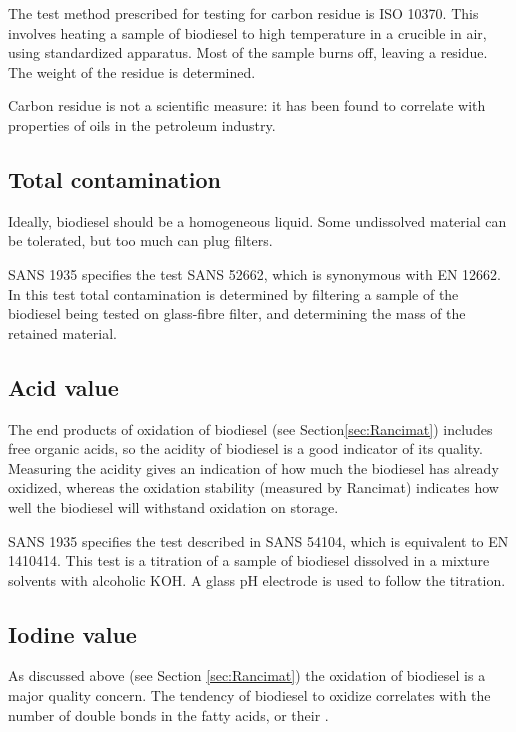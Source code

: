 The test method prescribed for testing for carbon residue is ISO 10370. This
involves heating a sample of biodiesel to high temperature in a crucible in air,
using standardized apparatus. Most of the sample burns off, leaving a residue.
The weight of the residue is determined.

Carbon residue is not a scientific measure: it has been found to correlate with
properties of oils in the petroleum industry.

\subsection{Total contamination}

Ideally, biodiesel should be a homogeneous liquid. Some undissolved material can
be tolerated, but too much can plug filters.

SANS 1935 specifies the test SANS 52662, which is synonymous with EN 12662. In
this test total contamination is determined by filtering a sample of the
biodiesel being tested on glass-fibre filter, and determining the mass of the
retained material.

\subsection{Acid value}

The end products of oxidation of biodiesel (see Section\ref{sec:Rancimat})
includes free organic acids, so the acidity of biodiesel is a good indicator of
its quality. Measuring the acidity gives an indication of how much the biodiesel
has already oxidized, whereas the oxidation stability (measured by Rancimat)
indicates how well the biodiesel will withstand oxidation on storage.

SANS 1935 specifies the test described in SANS 54104, which is equivalent to EN
1410414. This test is a titration of a sample of biodiesel dissolved in a
mixture solvents with alcoholic KOH. A glass pH electrode is used to follow the
titration.

\subsection{Iodine value}

As discussed above (see Section \ref{sec:Rancimat}) the oxidation of biodiesel
is a major quality concern. The tendency of biodiesel to oxidize correlates with
the number of double bonds in the fatty acids, or their .

